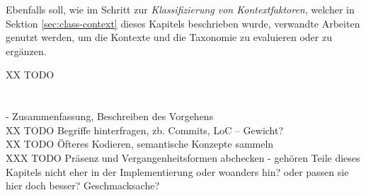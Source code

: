 Ebenfalls soll, wie im Schritt zur \textit{Klassifizierung von Kontextfaktoren}, welcher in Sektion \ref{sec:class-context} dieses Kapitels beschrieben wurde, verwandte Arbeiten genutzt werden, um die Kontexte und die Taxonomie zu evaluieren oder zu ergänzen.

XX TODO \section{} - Zusammenfassung, Beschreiben des Vorgehens \\
XX TODO Begriffe hinterfragen, zb. Commits, LoC – Gewicht? \\
XX TODO Öfteres Kodieren, semantische Konzepte sammeln \\




XXX TODO Präsenz und Vergangenheitsformen abchecken - gehören Teile dieses Kapitels nicht eher in der Implementierung oder woanders hin? oder passen sie hier doch besser? Geschmacksache? \\ 
